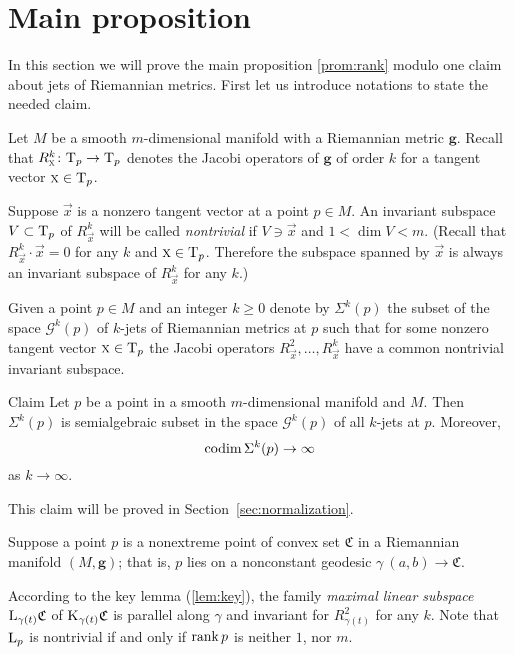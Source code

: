 \documentclass[a4paper,10pt]{article}
\begin{document}
\section{Main proposition}

In this section we will prove the main proposition \ref{prom:rank} modulo one claim about jets of Riemannian metrics.
First let us introduce notations to state the needed claim.

Let $M$ be a smooth $m$-dimensional manifold with a Riemannian metric $\bm{g}$.
Recall that $R^k_{\text{\sc{x}}}\colon\mathrm{T}_p\to\mathrm{T}_p$ denotes the Jacobi operators of $\bm{g}$ of order $k$ for a tangent vector $\text{\sc{x}}\in\mathrm{T}_p$.

Suppose $\vec x$ is a nonzero tangent vector at a point $p\in M$.
An invariant subspace $V\subset \mathrm{T}_p$ of $R^k_{\vec{x}}$ will be called \emph{nontrivial} if $V\ni \vec{x}$ and $1< \dim V<m$.
(Recall that $R^k_{\vec{x}}\cdot \vec{x}=0$
for any $k$ and $\text{\sc{x}}\in \mathrm{T}_p$.
Therefore the subspace spanned by $\vec{x}$ is always an invariant subspace of $R^k_{\vec{x}}$ for any $k$.)


Given a point $p\in M$ and an integer $k\ge0$ denote by $\Sigma^k(p)$ the subset of the space $\mathcal{G}^k(p)$ of $k$-jets of Riemannian metrics at $p$ such that for some nonzero tangent vector $\text{\sc{x}}\in\mathrm{T}_p$ the Jacobi operators $R^2_{\vec{x}},\dots,R^k_{\vec{x}}$ have a common nontrivial invariant subspace.


\begin{thm}{Claim}\label{clm:codim(sigma)} 
Let $p$ be a point in a smooth $m$-dimensional manifold and $M$.
Then $\Sigma^k(p)$ is semialgebraic subset in the space $\mathcal{G}^k(p)$ of all $k$-jets at $p$.
Moreover, 
\[\operatorname{\rm codim}\Sigma^k(p)\to\infty\] 
as $k\to\infty$.
\end{thm}

This claim will be proved in Section~\ref{sec:normalization}.

Suppose a point $p$ is a nonextreme point of convex set $\mathfrak{C}$ in a Riemannian manifold $(M,\bm{g})$;
that is, $p$ lies on a nonconstant geodesic $\gamma\:(a,b)\to\mathfrak{C}$.

According to the key lemma (\ref{lem:key}), the family \emph{maximal linear subspace} $\mathrm{L}_{\gamma(t)}\mathfrak{C}$ of $\mathrm{K}_{\gamma(t)}\mathfrak{C}$ is parallel along $\gamma$ and invariant for $R^2_{\gamma(t)}$ for any $k$.
Note that $\mathrm{L}_p$ is nontrivial if and only if $\operatorname{\rm rank}\nolimits p$ is neither $1$, nor $m$.
\end{document}
